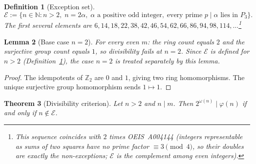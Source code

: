 \documentclass[12pt]{amsart}
\theoremstyle{bluehead}
\newtheorem{theorem}{Theorem}[section]
\newtheorem{lemma}[theorem]{Lemma}
\theoremstyle{orangehead}
\newtheorem{definition}[theorem]{Definition}
\theoremstyle{greenhead}
\newcommand{\Z}{\mathbb{Z}}
\newcommand{\N}{\mathbb{N}}
\renewcommand{\phi}{\varphi}
\newcommand{\Exc}{\mathcal{E}}
\begin{document}
\begin{definition}[Exception set]\label{def:exc}
\[
  \Exc:=\bigl\{n\in\N:n>2,\;n=2\alpha,\;
  \alpha\text{ a positive odd integer},\;
  \text{every prime }p\mid\alpha\text{ lies in }P_3\bigr\}.
\]
The first several elements are
$6,14,18,22,38,42,46,54,62,66,86,94,98,114,\ldots$\footnote{%
  This sequence coincides with $2$ times OEIS~A004144 (integers
  representable as sums of two squares have no prime factor $\equiv3\pmod4$,
  so their doubles are exactly the non-exceptions; $\mathcal{E}$ is
  the complement among even integers).}
\end{definition}

\begin{lemma}[Base case $n=2$]\label{lem:base}
  For every even $m$: the ring count equals $2$ and
  the surjective group count equals $1$, so divisibility fails at $n=2$.
  Since $\Exc$ is defined for $n>2$ (Definition~\ref{def:exc}),
  the case $n=2$ is treated separately by this lemma.
\end{lemma}

\begin{proof}
  The idempotents of $\Z_2$ are $0$ and $1$, giving two ring homomorphisms.
  The unique surjective group homomorphism sends $1\mapsto1$.
\qedhere
\end{proof}

\begin{theorem}[Divisibility criterion]\label{thm:div}
  Let $n>2$ and $n\mid m$.  Then
  $2^{\omega(n)}\mid\phi(n)$
  if and only if $n\notin\Exc$.
\end{theorem}
\end{document}
